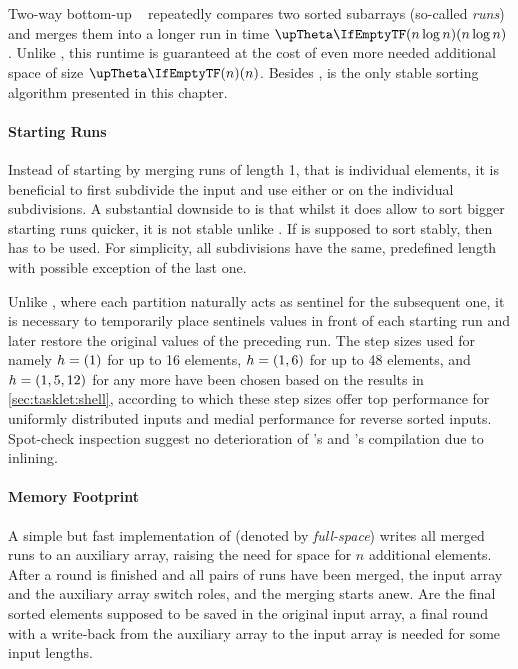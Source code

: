 \section{\texorpdfstring{\MS{}}{MergeSort}}
\label{sec:tasklet:merge}

Two-way bottom-up \MS{}~\cite{katajainen1997meticulous} repeatedly compares two sorted subarrays (so-called \emph{runs}) and merges them into a longer run in time \(\bigtheta{n \log n}\).
Unlike \QS{}, this runtime is guaranteed at the cost of even more needed additional space of size \(\bigtheta{n}\).
Besides \IS{}, \MS{} is the only stable sorting algorithm presented in this chapter.


\paragraph{Starting Runs}
Instead of starting by merging runs of length 1, that is individual elements, it is beneficial to first subdivide the input and use either \IS{} or \ShS{} on the individual subdivisions.
A substantial downside to \ShS{} is that whilst it does allow to sort bigger starting runs quicker, it is not stable unlike \IS{}.
If \MS{} is supposed to sort stably, then \IS{} has to be used.
For simplicity, all subdivisions have the same, predefined length with possible exception of the last one.

Unlike \QS{}, where each partition naturally acts as sentinel for the subsequent one, it is necessary to temporarily place sentinels values in front of each starting run and later restore the original values of the preceding run.
The step sizes used for \ShS{} \Dash namely \(h = (1)\) for up to 16 elements, \(h = (1, 6)\) for up to 48 elements, and \(h = (1, 5, 12)\) for any more \Dash have been chosen based on the results in \cref{sec:tasklet:shell}, according to which these step sizes offer top performance for uniformly distributed inputs and medial performance for reverse sorted inputs.
Spot-check inspection suggest no deterioration of \IS{}'s and \ShS{}'s compilation due to inlining.


\paragraph{Memory Footprint}
A simple but fast implementation of \MS{} (denoted by \emph{full-space}) writes all merged runs to an auxiliary array, raising the need for space for \(n\) additional elements.
After a round is finished and all pairs of runs have been merged, the input array and the auxiliary array switch roles, and the merging starts anew.
Are the final sorted elements supposed to be saved in the original input array, a final round with a write-back from the auxiliary array to the input array is needed for some input lengths.

